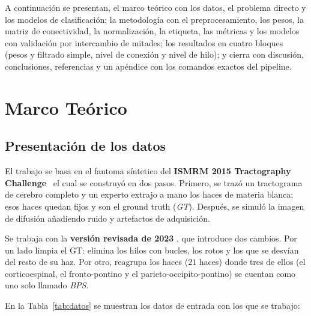 \documentclass[11pt,a4paper]{article}
\begin{document}
A continuación se presentan, el marco teórico con los datos, el problema directo y los modelos de clasificación; la metodología con el preprocesamiento, los pesos, la matriz de conectividad, la normalización, la etiqueta, las métricas y los modelos con validación por intercambio de mitades; los resultados en cuatro bloques (pesos y filtrado simple, nivel de conexión y nivel de hilo); y cierra con discusión, conclusiones, referencias y un apéndice con los comandos exactos del pipeline.




\section{Marco Teórico}

\subsection{Presentación de los datos}

El trabajo se basa en el fantoma síntetico del \textbf{ISMRM 2015 Tractography Challenge}~\cite{ismrm2015data} el cual se construyó en dos pasos. Primero, se trazó un tractograma de cerebro completo y un experto extrajo a mano los haces de materia blanca; esos haces quedan fijos y son el ground truth (\textit{GT}). Después, se simuló la imagen de difusión añadiendo ruido y artefactos de adquisición.

Se trabaja con la \textbf{versi\'on revisada de 2023} \cite{renauld2023}, que introduce dos
cambios. Por un lado limpia el GT: elimina los hilos con bucles, los rotos y los que se
desv\'ian del resto de su haz. Por otro, reagrupa los haces ($21$ haces) donde tres de ellos (el corticoespinal, el fronto-pontino y el parieto-occipito-pontino) se cuentan como uno solo llamado \textit{BPS}.

En la Tabla~\ref{tab:datos} se muestran los datos de entrada con los que se trabajo: 
\end{document}
